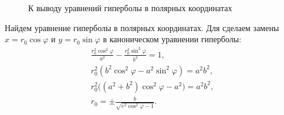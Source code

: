 \begin{wrapfigure}[9]{r}{0.5\tw}
    \caption{К выводу уравнений гиперболы в полярных координатах}
    \label{pic:hyp-polar-coord}    
\end{wrapfigure}
Найдем уравнение гиперболы в полярных координатах. Для сделаем замены $x = r_0 \cos \varphi$ и $y = r_0 \sin \varphi$ в каноническом уравнении гиперболы:
\begin{gather*}
    \frac{r_0^2 \cos^2 \varphi}{a^2} - \frac{r_0^2 \sin^2 \varphi}{b^2} = 1,\\
    r_0^2 ( b^2 \cos^2 \varphi - a^2 \sin^2 \varphi) = a^2 b^2,\\
    r_0^2 \big( (a^2 + b^2) \cos^2 \varphi - a^2 \big) = a^2 b^2,\\
    r_0 = \pm\frac{b}{\sqrt{e^2 \cos^2 \varphi - 1}}.
\end{gather*}

